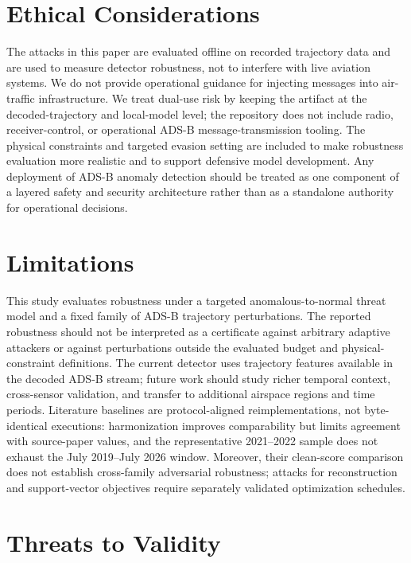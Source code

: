 \documentclass[runningheads]{llncs}
\begin{document}
\section{Ethical Considerations}
\label{sec:ethics}

The attacks in this paper are evaluated offline on recorded trajectory data and are used to measure detector robustness, not to interfere with live aviation systems.
We do not provide operational guidance for injecting messages into air-traffic infrastructure.
We treat dual-use risk by keeping the artifact at the decoded-trajectory and local-model level; the repository does not include radio, receiver-control, or operational ADS-B message-transmission tooling.
The physical constraints and targeted evasion setting are included to make robustness evaluation more realistic and to support defensive model development.
Any deployment of ADS-B anomaly detection should be treated as one component of a layered safety and security architecture rather than as a standalone authority for operational decisions.

\section{Limitations}
\label{sec:limitations}

This study evaluates robustness under a targeted anomalous-to-normal threat model and a fixed family of ADS-B trajectory perturbations.
The reported robustness should not be interpreted as a certificate against arbitrary adaptive attackers or against perturbations outside the evaluated budget and physical-constraint definitions.
The current detector uses trajectory features available in the decoded ADS-B stream; future work should study richer temporal context, cross-sensor validation, and transfer to additional airspace regions and time periods.
Literature baselines are protocol-aligned reimplementations, not byte-identical executions: harmonization improves comparability but limits agreement with source-paper values, and the representative 2021--2022 sample does not exhaust the July 2019--July 2026 window.
Moreover, their clean-score comparison does not establish cross-family adversarial robustness; attacks for reconstruction and support-vector objectives require separately validated optimization schedules.

\section{Threats to Validity}
\label{sec:threats_to_validity}
\end{document}
